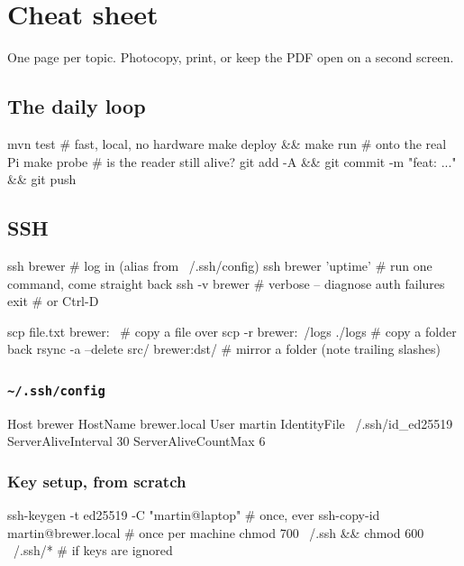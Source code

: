 \chapter{Cheat sheet}
\label{app:cheat}

One page per topic. Photocopy, print, or keep the PDF open on a second screen.

\section{The daily loop}

\begin{shell}
mvn test                      # fast, local, no hardware
make deploy && make run       # onto the real Pi
make probe                    # is the reader still alive?
git add -A && git commit -m "feat: ..." && git push
\end{shell}

\section{SSH}

\begin{shell}
ssh brewer                          # log in (alias from ~/.ssh/config)
ssh brewer 'uptime'                 # run one command, come straight back
ssh -v brewer                       # verbose -- diagnose auth failures
exit                                # or Ctrl-D

scp file.txt brewer:~               # copy a file over
scp -r brewer:~/logs ./logs         # copy a folder back
rsync -a --delete src/ brewer:dst/  # mirror a folder (note trailing slashes)
\end{shell}

\subsection*{\texttt{\textasciitilde/.ssh/config}}

\begin{trace}
Host brewer
    HostName brewer.local
    User martin
    IdentityFile ~/.ssh/id_ed25519
    ServerAliveInterval 30
    ServerAliveCountMax 6
\end{trace}

\subsection*{Key setup, from scratch}

\begin{shell}
ssh-keygen -t ed25519 -C "martin@laptop"    # once, ever
ssh-copy-id martin@brewer.local             # once per machine
chmod 700 ~/.ssh && chmod 600 ~/.ssh/*      # if keys are ignored
\end{shell}

